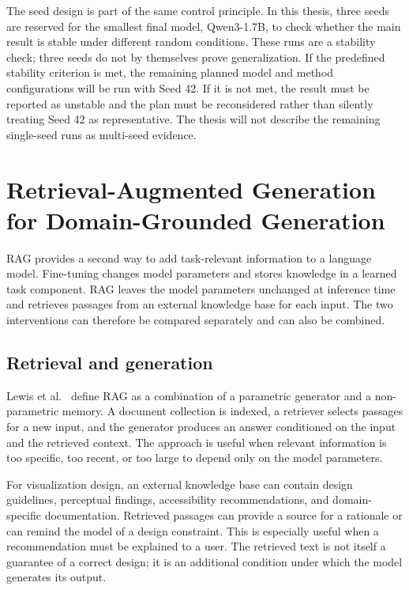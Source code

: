 The seed design is part of the same control principle. In this thesis, three seeds are reserved for the smallest final model, Qwen3-1.7B, to check whether the main result is stable under different random conditions. These runs are a stability check; three seeds do not by themselves prove generalization. If the predefined stability criterion is met, the remaining planned model and method configurations will be run with Seed 42. If it is not met, the result must be reported as unstable and the plan must be reconsidered rather than silently treating Seed 42 as representative. The thesis will not describe the remaining single-seed runs as multi-seed evidence.

\section{Retrieval-Augmented Generation for Domain-Grounded Generation}

RAG provides a second way to add task-relevant information to a language model. Fine-tuning changes model parameters and stores knowledge in a learned task component. RAG leaves the model parameters unchanged at inference time and retrieves passages from an external knowledge base for each input. The two interventions can therefore be compared separately and can also be combined.

\subsection{Retrieval and generation}

Lewis et al.~\cite{lewis2020rag} define RAG as a combination of a parametric generator and a non-parametric memory. A document collection is indexed, a retriever selects passages for a new input, and the generator produces an answer conditioned on the input and the retrieved context. The approach is useful when relevant information is too specific, too recent, or too large to depend only on the model parameters.

For visualization design, an external knowledge base can contain design guidelines, perceptual findings, accessibility recommendations, and domain-specific documentation. Retrieved passages can provide a source for a rationale or can remind the model of a design constraint. This is especially useful when a recommendation must be explained to a user. The retrieved text is not itself a guarantee of a correct design; it is an additional condition under which the model generates its output.

